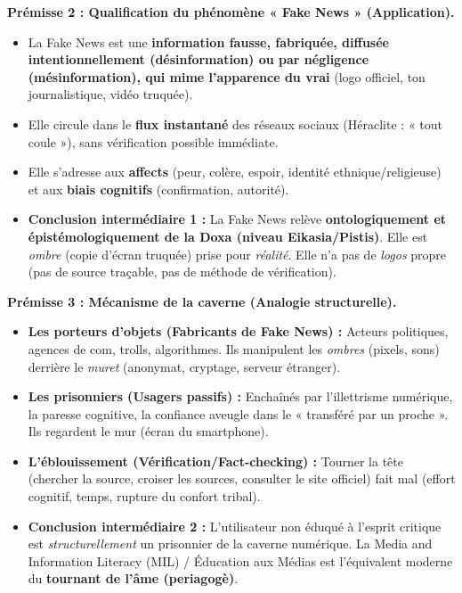 \documentclass[11pt]{article}
\newcommand{\cle}[1]{{\popxbold\color{popdark}#1}}
\begin{document}
\begin{exoresolu}
\textbf{Prémisse 2 : Qualification du phénomène « Fake News » (Application).}
\begin{itemize}
    \item La Fake News est une \textbf{information fausse, fabriquée, diffusée intentionnellement (désinformation) ou par négligence (mésinformation), qui mime l'apparence du vrai} (logo officiel, ton journalistique, vidéo truquée).
    \item Elle circule dans le \textbf{flux instantané} des réseaux sociaux (Héraclite : « tout coule »), sans vérification possible immédiate.
    \item Elle s'adresse aux \textbf{affects} (peur, colère, espoir, identité ethnique/religieuse) et aux \textbf{biais cognitifs} (confirmation, autorité).
    \item \textbf{Conclusion intermédiaire 1 :} La Fake News relève \textbf{ontologiquement et épistémologiquement de la Doxa (niveau Eikasia/Pistis)}. Elle est \emph{ombre} (copie d'écran truquée) prise pour \emph{réalité}. Elle n'a pas de \emph{logos} propre (pas de source traçable, pas de méthode de vérification).
\end{itemize}

\textbf{Prémisse 3 : Mécanisme de la caverne (Analogie structurelle).}
\begin{itemize}
    \item \textbf{Les porteurs d'objets (Fabricants de Fake News) :} Acteurs politiques, agences de com, trolls, algorithmes. Ils manipulent les \emph{ombres} (pixels, sons) derrière le \emph{muret} (anonymat, cryptage, serveur étranger).
    \item \textbf{Les prisonniers (Usagers passifs) :} Enchaînés par l'illettrisme numérique, la paresse cognitive, la confiance aveugle dans le « transféré par un proche ». Ils regardent le mur (écran du smartphone).
    \item \textbf{L'éblouissement (Vérification/Fact-checking) :} Tourner la tête (chercher la source, croiser les sources, consulter le site officiel) fait mal (effort cognitif, temps, rupture du confort tribal).
    \item \textbf{Conclusion intermédiaire 2 :} L'utilisateur non éduqué à l'esprit critique est \emph{structurellement} un prisonnier de la caverne numérique. La \cle{Media and Information Literacy (MIL)} / Éducation aux Médias est l'équivalent moderne du \textbf{tournant de l'âme (periagogè)}.
\end{itemize}


\end{exoresolu}
\end{document}
